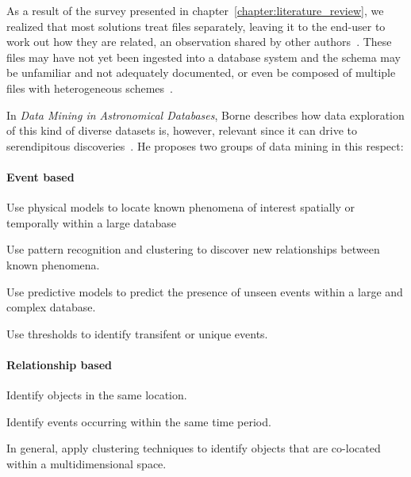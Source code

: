 As a result of the survey presented in chapter~\ref{chapter:literature_review},
we realized that most solutions treat files
separately, leaving it to the end-user to work out how they are related,
an observation shared by other authors~\cite{Silva2016}.
These files may have not yet been ingested into a database system and 
the schema may be unfamiliar and not adequately documented, or even be
composed of multiple files with heterogeneous schemes~\cite{alawini2016,zhang2015astronomy}.

In \emph{Data Mining in Astronomical Databases}, Borne
describes how data exploration of this kind of diverse datasets is, however,
relevant since it can drive to serendipitous discoveries~\cite{Borne2001}. He proposes
two groups of data mining in this respect:

\paragraph{Event based}

\begin{description}[leftmargin=1cm, labelindent=0.5cm]
  \item[Known events / known algorithms]
    Use physical models to locate known phenomena of interest spatially
    or temporally within a large database
  \item[Known events / unknown algorithms]
    Use pattern recognition and clustering to discover new relationships between known
    phenomena.
  \item[Unknown events / known algorithms]
    Use predictive models to predict the presence of unseen events within a
    large and complex database.
  \item[Unknown events / unknown algorithms]
    Use thresholds to identify transifent or unique events.
\end{description}

\paragraph{Relationship based}

\begin{description}[leftmargin=1cm, labelindent=0.5cm]
    \item[Spatial]
        Identify objects in the same location.
    \item[Temporal]
        Identify events occurring within the same time period.
    \item[Coincidence]
        In general, apply clustering techniques to
        identify objects that are co-located within a multidimensional space.
\end{description}

